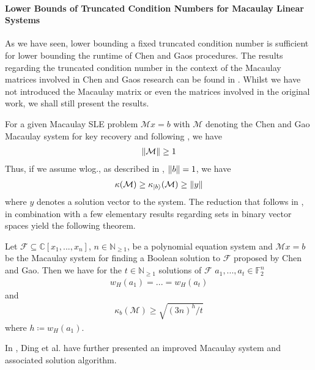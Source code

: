 \paragraph*{Lower Bounds of Truncated Condition Numbers for Macaulay Linear Systems} As we have seen, lower bounding a fixed truncated condition number is sufficient for lower bounding the runtime of Chen and Gaos procedures. The results regarding the truncated condition number in the context of the Macaulay matrices involved in Chen and Gaos research can be found in \cite[pp. 8-13]{Ding2021}. Whilst we have not introduced the Macaulay matrix or even the matrices involved in the original work, we shall still present the results.

For a given Macaulay SLE problem \(\mathcal{M}x = b\) with \(\mathcal{M}\) denoting the Chen and Gao Macaulay system for key recovery and following \cite[pp. 8-9]{Ding2021}, we have
\begin{align}
    \norm{\mathcal{M}} \geq 1
\end{align}
Thus, if we assume wlog., as described in , \(\norm{b} = 1\), we have
\begin{align}
    \kappa(\mathcal{M}) \geq \kappa_{\ket{b}}(\mathcal{M}) \geq \norm{y}
\end{align}
where \(y\) denotes a solution vector to the system. The reduction that follows in \cite[pp. 9-10]{Ding2021}, in combination with a few elementary results regarding sets in binary vector spaces yield the following theorem.
\begin{theorem}
    Let \(\mathcal{F} \subseteq \mathbb{C}[x_1, ..., x_n]\), \(n \in \mathbb{N}_{\geq 1}\), be a polynomial equation system and \(\mathcal{M}x = b\) be the Macaulay system for finding a Boolean solution to \(\mathcal{F}\) proposed by Chen and Gao. Then we have for the \(t \in \mathbb{N}_{\geq 1}\) solutions of \(\mathcal{F}\) \(a_1, ..., a_t \in \mathbb{F}_2^n\)
    \begin{align}
        w_H(a_1) = ... = w_H(a_t)
    \end{align}
    and
    \begin{align}
        \kappa_{b}(\mathcal{M}) \geq \sqrt{(3n)^h/t}
    \end{align}
    where \(h \coloneqq w_H(a_1)\).
\end{theorem}
In \cite[pp. 13-21]{Ding2021}, Ding et al. have further presented an improved Macaulay system and associated solution algorithm.

